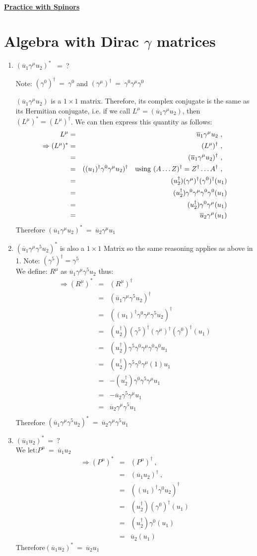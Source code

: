 \documentclass[12pt]{article}
\def \bea{\begin{eqnarray}}
\def \eea{\end{eqnarray}}
\def \nn{\nonumber}
\def \nl{\nn \\}
\def \ou{\overline{u}}
\def \ga{\gamma}
\begin{document}
\begin{center}
\underline{\textbf{\Large Practice with Spinors}}
\end{center}

\section{Algebra with Dirac $\ga$ matrices}

\begin{enumerate}

\item$(\ou_1\ga^\mu u_2)^*$ ~=~?

Note: $(\ga^0)^\dag~=~\ga^0$ and $(\ga^\mu)^\dag~=~ \ga^0\ga^\mu\ga^0$

$(\ou_1\ga^\mu u_2)$ is a $1\times1$ matrix. Therefore, its complex conjugate is the same as its Hermitian conjugate, i.e. if we call
$L^\mu = (\ou_1\ga^\mu u_2)$, then $(L^\mu)^* = (L^\mu)^\dag$. We can then express this quantity as follows:
\bea
L^\mu &=& \ou_1\ga^\mu u_2 ~,~~ \nonumber \\ \nonumber
\Rightarrow (L^\mu)^* &=& (L^\mu)^\dag ~,~~ \nl
&=& (\ou_1\ga^\mu u_2)^\dag ~,~~ \nl
&=& ((u_1)^\dag\ga^0\ga^\mu u_2)^\dag ~~~{\rm using}~(A\ldots Z)^\dag = Z^\dag\ldots A^\dag ~,~~ \nl
&=& (u_2^\dag)(\ga^\mu)^\dag(\ga^0)^\dag(u_1)\nl
&=& (u_2^\dag)\ga^0\ga^\mu\ga^0\ga^0(u_1)\nl
&=& (u_2^\dag)\ga^0\ga^\mu(u_1)\nl
&=& \ou_2\ga^\mu(u_1) \nonumber
\eea \nonumber
Therefore $(\ou_1\ga^\mu u_2)^*~=~\ou_2\ga^\mu u_1 $
%
\item $(\ou_1\ga^\mu \ga^5 u_2)^*$ is also a $1\times1$ Matrix so the same reasoning applies as above in 1. Note: $(\ga^5)^\dag = \ga^5$\nl
We define: $R^\mu$ as $\ou_1\ga^\mu\ga^5 u_2$ thus: 
\bea
\Rightarrow (R^\mu)^* &=& (R^\mu)^\dag \nl
&=&(\ou_1\ga^\mu\ga^5 u_2)^\dag  \nl
&=& ((u_1)^\dag\ga^0\ga^\mu\ga^5 u_2)^\dag \nl
&=& (u_2^\dag)(\ga^5)^\dag(\ga^\mu)^\dag(\ga^0)^\dag(u_1)\nl
&=& (u_2^\dag)\ga^5\ga^0\ga^\mu\ga^0\ga^0 u_1\nl
&=& (u_2^\dag)\ga^5\ga^0\ga^\mu(1) u_1\nl
&=& -(u_2^\dag)\ga^0\ga^5\ga^\mu u_1\nl
&=& -\ou_2\ga^5\ga^\mu u_1\nl
&=& \ou_2\ga^\mu\ga^5 u_1\nl\nonumber
\eea \nonumber
%
Therefore $(\ou_1\ga^\mu \ga^5 u_2)^*~=~\ou_2 \ga^\mu \ga^5 u_1$
\item $ (\ou_1 u_2)^* ~=~ ?$ \nl
We let:$P^\mu ~=~ \ou_1 u_2$
\bea
\Rightarrow (P^\mu)^* &=& (P^\mu)^\dag ~,~~ \nl
&=& (\ou_1 u_2)^\dag ~,~~ \nl
&=& ((u_1)^\dag\ga^0 u_2)^\dag \nl
&=& (u_2^\dag)(\ga^0)^\dag(u_1)\nl
&=& (u_2^\dag)\ga^0(u_1)\nl
&=& \ou_2(u_1) \nonumber
\eea \nonumber
%
Therefore$(\ou_1 u_2)^* ~=~ \ou_2 u_1$


\end{enumerate}
\end{document}
